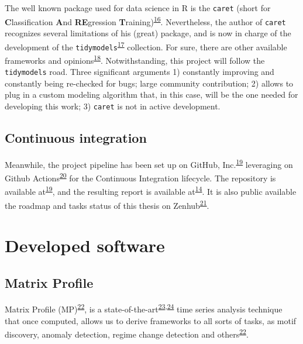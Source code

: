 \documentclass[12pt,twoside]{fmupthesis}
\begin{document}
The well known package used for data science in R is the \texttt{caret} (short for \textbf{C}lassification
\textbf{A}nd \textbf{RE}gression \textbf{T}raining)\textsuperscript{\protect\hyperlink{ref-JSSv028i05}{16}}. Nevertheless, the author of \texttt{caret} recognizes
several limitations of his (great) package, and is now in charge of the development of the
\texttt{tidymodels}\textsuperscript{\protect\hyperlink{ref-tidymodels2020}{17}} collection. For sure, there are other available frameworks and
opinions\textsuperscript{\protect\hyperlink{ref-Thompson2020}{18}}. Notwithstanding, this project will follow the \texttt{tidymodels} road. Three
significant arguments 1) constantly improving and constantly being re-checked for bugs; large
community contribution; 2) allows to plug in a custom modeling algorithm that, in this case, will be
the one needed for developing this work; 3) \texttt{caret} is not in active development.

\hypertarget{continuous-integration}{%
\subsection{Continuous integration}\label{continuous-integration}}

Meanwhile, the project pipeline has been set up on GitHub, Inc.\textsuperscript{\protect\hyperlink{ref-bischoffrepo2021}{19}} leveraging on
Github Actions\textsuperscript{\protect\hyperlink{ref-gitactions2021}{20}} for the Continuous Integration lifecycle. The repository is
available at\textsuperscript{\protect\hyperlink{ref-bischoffrepo2021}{19}}, and the resulting report is available at\textsuperscript{\protect\hyperlink{ref-franz_website}{14}}.
It is also public available the roadmap and tasks status of this thesis on Zenhub\textsuperscript{\protect\hyperlink{ref-zenhub2021}{21}}.

\hypertarget{developed-software}{%
\section{Developed software}\label{developed-software}}

\hypertarget{matrixprofile}{%
\subsection{Matrix Profile}\label{matrixprofile}}

Matrix Profile (MP)\textsuperscript{\protect\hyperlink{ref-Yeh2017a}{22}}, is a state-of-the-art\textsuperscript{\protect\hyperlink{ref-DePaepe2020}{23},\protect\hyperlink{ref-Feremans2020}{24}} time series
analysis technique that once computed, allows us to derive frameworks to all sorts of tasks, as
motif discovery, anomaly detection, regime change detection and others\textsuperscript{\protect\hyperlink{ref-Yeh2017a}{22}}.
\end{document}
